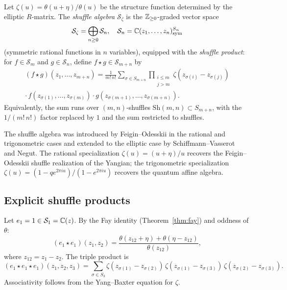 \begin{definition}\label{def:shuffle-algebra}
Let $\zeta(u) = \theta(u+\eta)/\theta(u)$ be the structure function
determined by the elliptic $R$-matrix.
The \emph{shuffle algebra} $\mathcal{S}_\zeta$ is the $\mathbb{Z}_{\geq 0}$-graded
vector space
\[
\mathcal{S}_\zeta = \bigoplus_{n \geq 0} \mathcal{S}_n, \quad
\mathcal{S}_n = \mathbb{C}(z_1, \ldots, z_n)^{S_n}_{\mathrm{sym}}
\]
(symmetric rational functions in $n$ variables), equipped with
the \emph{shuffle product}:
for $f \in \mathcal{S}_m$ and $g \in \mathcal{S}_n$, define
$f \star g \in \mathcal{S}_{m+n}$ by
\begin{multline}\label{eq:shuffle-product}
(f \star g)(z_1, \ldots, z_{m+n})
= \frac{1}{m!\,n!} \sum_{\sigma \in S_{m+n}}
\prod_{\substack{i \leq m \\ j > m}}
\zeta(z_{\sigma(i)} - z_{\sigma(j)}) \\
\cdot\, f(z_{\sigma(1)}, \ldots, z_{\sigma(m)})
\cdot g(z_{\sigma(m+1)}, \ldots, z_{\sigma(m+n)}).
\end{multline}
Equivalently, the sum runs over $(m,n)$-shuffles
$\mathrm{Sh}(m,n) \subset S_{m+n}$, with
the $1/(m!\,n!)$ factor replaced by $1$ and the
sum restricted to shuffles.
\end{definition}

\begin{remark}[Origin]\label{rem:shuffle-origin}
The shuffle algebra was introduced by
Feigin--Odesskii in the rational and
trigonometric cases and extended to the elliptic case by
Schiffmann--Vasserot~\cite{SV13} and Negut.
The rational specialization $\zeta(u) = (u+\eta)/u$
recovers the Feigin--Odesskii shuffle realization of the
Yangian; the trigonometric specialization
$\zeta(u) = (1 - q e^{2\pi i u})/(1 - e^{2\pi i u})$
recovers the quantum affine algebra.
\end{remark}

\subsection{Explicit shuffle products}
\label{subsec:shuffle-explicit}

\begin{computation}\label{comp:shuffle-generators}
Let $e_1 = 1 \in \mathcal{S}_1 = \mathbb{C}(z)$.  By the Fay identity (Theorem~\ref{thm:fay}) and oddness of $\theta$:
\begin{equation}\label{eq:e1e1-result}
(e_1 \star e_1)(z_1, z_2)
= \frac{\theta(z_{12}+\eta) + \theta(\eta-z_{12})}
{\theta(z_{12})},
\end{equation}
where $z_{12} = z_1 - z_2$.  The triple product is
\begin{equation}\label{eq:shuffle-e1e1e1}
(e_1 \star e_1 \star e_1)(z_1, z_2, z_3)
= \sum_{\sigma \in S_3}
\zeta(z_{\sigma(1)} - z_{\sigma(2)})\,
\zeta(z_{\sigma(1)} - z_{\sigma(3)})\,
\zeta(z_{\sigma(2)} - z_{\sigma(3)}).
\end{equation}
Associativity follows from the Yang--Baxter equation for $\zeta$.
\end{computation}

